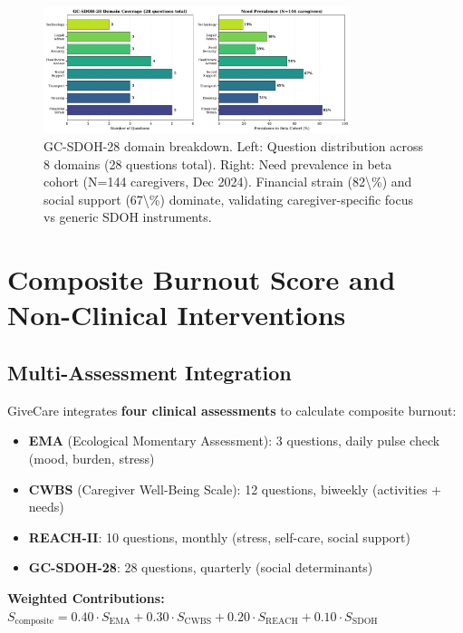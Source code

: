 \documentclass{article}%
\begin{document}
%
\begin{figure}[htbp]%
\centering%
\includegraphics[width=0.8\textwidth]{fig7_gcsdoh_domains.pdf}%
\caption{GC{-}SDOH{-}28 domain breakdown. Left: Question distribution across 8 domains (28 questions total). Right: Need prevalence in beta cohort (N=144 caregivers, Dec 2024). Financial strain (82\textbackslash{}\%) and social support (67\textbackslash{}\%) dominate, validating caregiver{-}specific focus vs generic SDOH instruments.}%
\label{fig:gcsdoh}%
\end{figure}%
\section{Composite Burnout Score and Non{-}Clinical Interventions}%
\label{sec:CompositeBurnoutScoreandNon{-}ClinicalInterventions}%
%
\subsection{Multi{-}Assessment Integration}%
\label{subsec:Multi{-}AssessmentIntegration}%
GiveCare integrates \textbf{four clinical assessments} to calculate composite burnout:

\begin{itemize}
    \item \textbf{EMA} (Ecological Momentary Assessment): 3 questions, daily pulse check (mood, burden, stress)
    \item \textbf{CWBS} (Caregiver Well-Being Scale): 12 questions, biweekly (activities + needs)~\cite{tebb1999}
    \item \textbf{REACH-II}: 10 questions, monthly (stress, self-care, social support)~\cite{bella2006}
    \item \textbf{GC-SDOH-28}: 28 questions, quarterly (social determinants)
\end{itemize}

\textbf{Weighted Contributions:} $S_{\text{composite}} = 0.40 \cdot S_{\text{EMA}} + 0.30 \cdot S_{\text{CWBS}} + 0.20 \cdot S_{\text{REACH}} + 0.10 \cdot S_{\text{SDOH}}$
\end{document}
